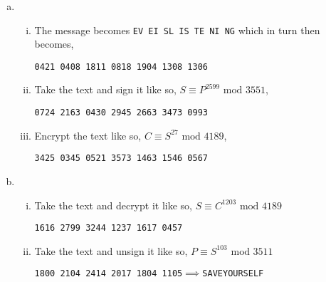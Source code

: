 \documentclass[class=article, crop=false]{standalone}
\begin{document}
\subsubsection{}
\begin{enumerate}[(a)]
  \item
    \begin{enumerate}[i.]
    \item
      The message becomes \verb|EV EI SL IS TE NI NG| which in turn then becomes,
      \begin{center}
        \verb|0421 0408 1811 0818 1904 1308 1306|
      \end{center}

    \item
      Take the text and sign it like so, 
      $S\equiv P^{2599}\mbox{ mod }3551$,
      \begin{center}
        \verb|0724 2163 0430 2945 2663 3473 0993|
      \end{center}
      
      
    \item
      Encrypt the text like so, $C \equiv S^{27}\mbox{ mod }4189$,
      \begin{center}
        \verb|3425 0345 0521 3573 1463 1546 0567|
      \end{center}

    \end{enumerate}

  \item
    \begin{enumerate}[i.]
    \item
      Take the text and decrypt it like so,
      $S\equiv C^{1203}\mbox{ mod } 4189$
      \begin{center}
        \verb|1616 2799 3244 1237 1617 0457|
      \end{center}

    \item
      Take the text and unsign it like so,
      $P\equiv S^{103}\mbox{ mod }3511$
      \begin{center}
        \verb|1800 2104 2414 2017 1804 1105|$\implies$\verb|SAVEYOURSELF|
      \end{center}

    \end{enumerate}

\end{enumerate}
\end{document}
